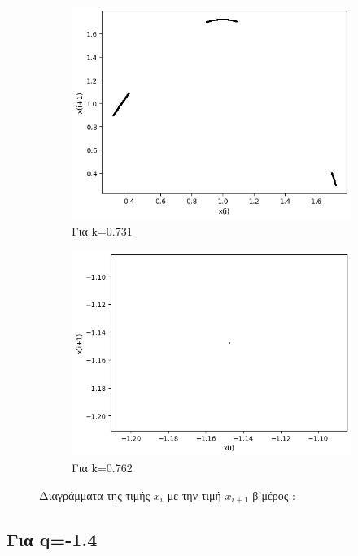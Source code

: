 \begin{figure}[h!]
\begin{subfigure}[b]{0.4\textwidth}
		\includegraphics[width=\textwidth]{LateX images/graphs q12/g11}
		\caption{Για k=0.731}
		\label{f:k67}
	\end{subfigure}
	\hfill
	\begin{subfigure}[b]{0.4\textwidth}
		\centering
		\includegraphics[width=\textwidth]{LateX images/graphs q12/g12}
		\caption{Για k=0.762}
		\label{f:k68}
	\end{subfigure}
	\hfill
\caption{Διαγράμματα της τιμής \(x_i\) με την τιμή \(x_{i+1}\) β'μέρος :}	
\end{figure}

\clearpage

\subsection{Για q=-1.4}

